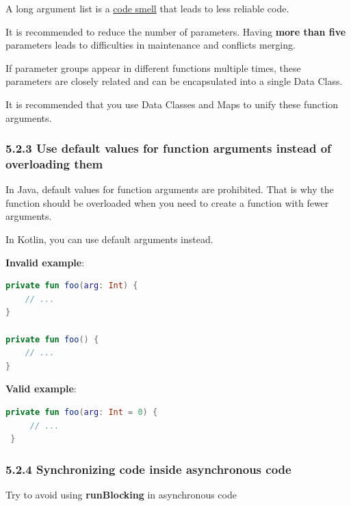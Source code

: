 A long argument list is a \href{https://en.wikipedia.org/wiki/Code\_smell}{code smell} that leads to less reliable code.

It is recommended to reduce the number of parameters. Having \textbf{more than five} parameters leads to difficulties in maintenance and conflicts merging.

If parameter groups appear in different functions multiple times, these parameters are closely related and can be encapsulated into a single Data Class.

It is recommended that you use Data Classes and Maps to unify these function arguments.



\subsubsection*{\textbf{5.2.3 Use default values for function arguments instead of overloading them}}
\leavevmode\newline

\label{sec:5.2.3}

In Java, default values for function arguments are prohibited. That is why the function should be overloaded when you need to create a function with fewer arguments.

In Kotlin, you can use default arguments instead.



\textbf{Invalid example}:

\begin{lstlisting}[language=Kotlin]
private fun foo(arg: Int) {
    // ...
}

private fun foo() {
    // ...
}
\end{lstlisting}


\textbf{Valid example}:

\begin{lstlisting}[language=Kotlin]
 private fun foo(arg: Int = 0) {
     // ...
 }
\end{lstlisting}
\subsubsection*{\textbf{5.2.4 Synchronizing code inside asynchronous code}}
\leavevmode\newline

\label{sec:5.2.4}

Try to avoid using \textbf{runBlocking} in asynchronous code




